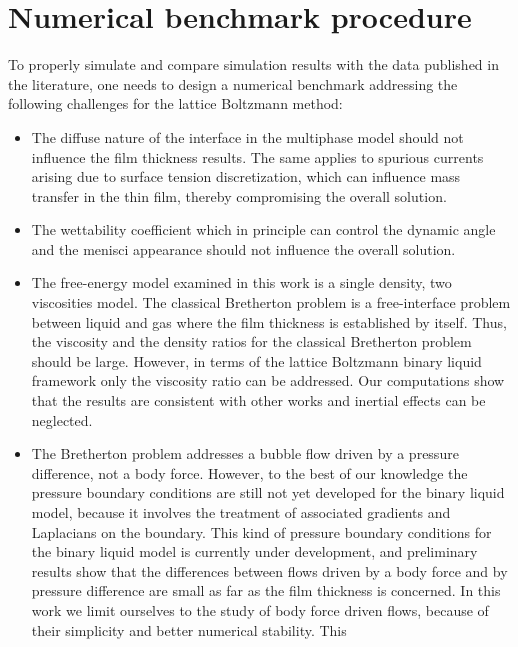 \documentclass[preprint,12pt]{elsarticle}
\begin{document}
\section{Numerical benchmark procedure}
To properly simulate and compare simulation results with the data
published in the literature, one needs to design a numerical benchmark addressing
the following challenges for the lattice Boltzmann method:
\begin{itemize}
 \item The diffuse nature of the interface in the multiphase model should not
influence the film thickness results.  The same applies to spurious
currents arising due to surface tension discretization, which
can influence mass transfer in the thin film, thereby compromising the
overall solution. 
 \item The wettability coefficient which in principle can control the
dynamic angle and the menisci appearance \cite{pagonabarraga-finger} should not
influence the overall solution.
 \item The free-energy model examined in this work is a single density, two
viscosities model. The classical Bretherton problem is a free-interface problem between liquid and
gas
where the film thickness is established by itself. Thus, the viscosity and the density ratios for
the
classical
Bretherton problem should
be large. However, in terms of the lattice Boltzmann binary liquid framework only the viscosity
ratio can be addressed. Our computations show that the results are consistent with other works and
inertial effects can be neglected.
  \item The Bretherton problem addresses a bubble flow driven by a pressure
difference, not a body force. However, to the best of our knowledge the pressure boundary
conditions are still not yet developed for the binary liquid model, because it involves the
treatment of associated gradients and Laplacians on the boundary.
This kind of pressure boundary conditions for the binary liquid model is currently
under development, and preliminary results show that the differences between flows driven by a body
force and by
pressure difference are small as far as the film
 thickness is concerned.  In this work we limit ourselves to the study
of body force driven flows, because of their simplicity and better numerical stability. This

\end{itemize}
\end{document}
